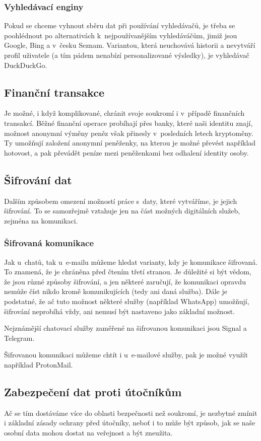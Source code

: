 \subsubsection*{Vyhledávací enginy}
Pokud se chceme vyhnout sběru dat při používání vyhledávačů, je třeba se poohlédnout po alternativách k~nejpoužívanějším vyhledáváčům, jimiž jsou Google, Bing a v~česku Seznam. Variantou, která neuchovává historii a nevytváří profil uživatele (a tím pádem nenabízí personalizované výsledky), je vyhledávač DuckDuckGo.

\subsection{Finanční transakce}
Je možné, i když komplikované, chránit svoje soukromí i v~případě finančních transakcí. Běžné finanční operace probíhají přes banky, které naši identitu znají, možnost anonymní výměny peněz však přinesly v~posledních letech kryptoměny. Ty umožňují založení anonymní peněženky, na kterou je možné převést například hotovost, a pak převádět peníze mezi peněženkami bez odhalení identity osoby.


\subsection{Šifrování dat}
Dalším způsobem omezení možností práce s~daty, které vytváříme, je jejich šifrování. To se samozřejmě vztahuje jen na část možných digitálních služeb, zejména na komunikaci.
\subsubsection*{Šifrovaná komunikace}
Jak u~chatů, tak u~e-mailu můžeme hledat varianty, kdy je komunikace šifrovaná. To znamená, že je chráněna před čtením třetí stranou. Je důležité si být vědom, že jsou různé způsoby šifrování, a jen některé zaručují, že komunikaci opravdu nemůže číst nikdo kromě komunikujících (tedy ani daná služba). Dále je podstatné, že ač tuto možnost některé služby (například WhatsApp) umožňují, šifrování neprobíhá vždy, ani nemusí být nastaveno jako základní možnost.

Nejznámější chatovací služby zaměřené na šifrovanou komunikaci jsou Signal a Telegram.

Šifrovanou komunikaci můžeme chtít i u~e-mailové služby, pak je možné využít například ProtonMail. 


\subsection{Zabezpečení dat proti útočníkům}
Ač se tím dostáváme více do oblasti bezpečnosti než soukromí, je nezbytné zmínit i základní zásady ochrany před útočníky, neboť i to může být způsob, jak se naše osobní data mohou dostat na veřejnost a být zneužita.

